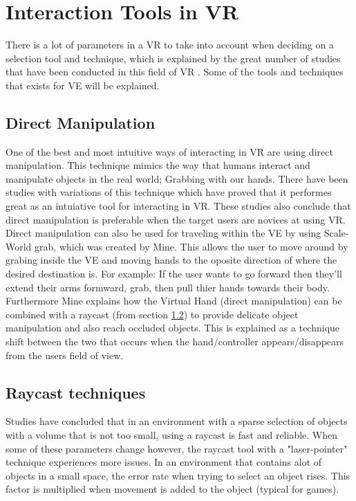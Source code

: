 \section{Interaction Tools in VR}
\label{theory:toolsandtech}
There is a lot of parameters in a VR to take into account when deciding on a selection tool and technique, which is explained by the great number of studies that have been conducted in this field of VR \cite{tools:poupyrev1996go,tools:mine1997moving,tools:Cutler1997,tools:bowman2001introduction}. Some of the tools and techniques that exists for VE will be explained.

\subsection{Direct Manipulation}
\label{theory:toolsandtech:direct}
One of the best and most intuitive ways of interacting in VR are using direct manipulation\cite{tools:jacoby1994gestural}. This technique mimics the way that humans interact and manipulate objects in the real world; Grabbing with our hands. There have been studies with variations of this technique which have proved that it performes great as an intuiative tool for interacting in VR\cite{tools:Buchmann2004,tools:Cutler1997}. These studies also conclude that direct manipulation is preferable when the target users are novices at using VR. Direct manipulation can also be used for traveling within the VE by using Scale-World grab, which was created by Mine\cite{tools:mine1997moving}. This allows the user to move around by grabing inside the VE and moving hands to the oposite direction of where the desired destination is. For example: If the user wants to go forward then they'll extend their arms formward, grab, then pull thier hands towards their body. Furthermore Mine explains how the Virtual Hand (direct manipulation) can be combined with a raycast (from section \ref{theory:toolsandtech:raycast}) to provide delicate object manipulation and also reach occluded objects. This is explained as a technique shift between the two that occurs when the hand/controller appears/disappears from the users field of view.

\subsection{Raycast techniques}
\label{theory:toolsandtech:raycast}
Studies have concluded that in an environment with a sparse selection of objects with a volume that is not too small, using a raycast is fast and reliable\cite{tools:fitzmaurice1993situated}. When some of these parameters change however, the raycast tool with a "laser-pointer" technique experiences more issues. In an environment that contains alot of objects in a small space, the error rate when trying to select an object rises\cite{tools:ware1988using}. This factor is multiplied when movement is added to the object (typical for games).


